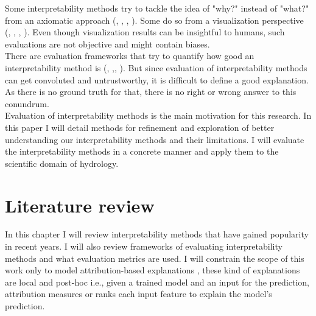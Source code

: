 \documentclass[12pt]{report}
\begin{document}
Some interpretability methods try to tackle the idea of "why?" instead of "what?" from an axiomatic approach (\cite{DBLP:journals/corr/SundararajanTY17}, \cite{DBLP:journals/corr/abs-2111-07668}, \cite{DBLP:journals/corr/MontavonSM17}, \cite{https://doi.org/10.48550/arxiv.1711.00867}). Some do so from a visualization perspective (\cite{DBLP:journals/corr/abs-1802-00614}, \cite{DBLP:journals/corr/ZhouKLOT15}, \cite{DBLP:journals/corr/ZeilerF13}, \cite{DBLP:journals/corr/SelvarajuDVCPB16}). Even though visualization results can be insightful to humans, such evaluations are not objective and might contain biases.\\ 

There are evaluation frameworks that try to quantify how good an interpretability method is (\cite{DBLP:journals/corr/abs-1912-01451}, \cite{https://doi.org/10.48550/arxiv.1509.06321} \cite{https://doi.org/10.48550/arxiv.1806.10758} \cite{DBLP:journals/corr/MontavonSM17},\cite{LRP},  \cite{DBLP:journals/corr/ArrasHMMS16a}). But since evaluation of interpretability methods can get convoluted and untrustworthy, it is difficult to define a good explanation. As there is no ground truth for that, there is no right or wrong answer to this conundrum. \\ 

Evaluation of interpretability methods is the main motivation for this research. In this paper I will detail methods for refinement and exploration of better understanding our interpretability methods and their limitations. I will evaluate the interpretability methods in a concrete manner and apply them to the scientific domain of hydrology.


\newpage

\chapter{Literature review} 

In this chapter I will review interpretability methods that have gained popularity in recent years. I will also review frameworks of evaluating interpretability methods and what evaluation metrics are used. I will constrain the scope of this work only to model attribution-based explanations \cite{electronics10050593}, these kind of explanations are local and post-hoc i.e., given a trained model and an input for the prediction, attribution measures or ranks each input feature to explain the model's prediction. \\
\end{document}
